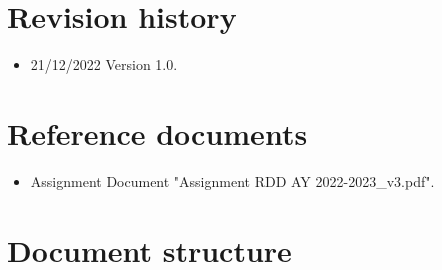 \documentclass[a4paper]{report}
\begin{document}
\section{Revision history}
\begin{itemize}
\item 21/12/2022 Version 1.0.
\end{itemize}
\section{Reference documents}
\begin{itemize}
\item Assignment Document "Assignment RDD AY 2022-2023\_v3.pdf".
\end{itemize}
\section{Document structure}
\end{document}
